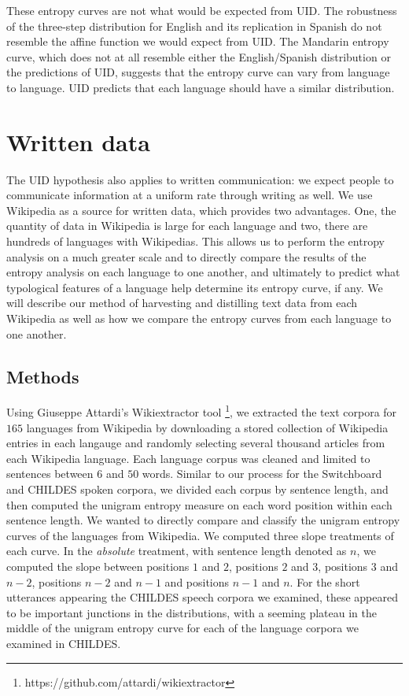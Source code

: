 \documentclass[10pt, letterpaper]{article}
\begin{document}
These entropy curves are not what would be expected from UID. The
robustness of the three-step distribution for English and its
replication in Spanish do not resemble the affine function we would
expect from UID. The Mandarin entropy curve, which does not at all
resemble either the English/Spanish distribution or the predictions of
UID, suggests that the entropy curve can vary from language to language.
UID predicts that each language should have a similar distribution.

\section{Written data}\label{written-data}

The UID hypothesis also applies to written communication: we expect
people to communicate information at a uniform rate through writing as
well. We use Wikipedia as a source for written data, which provides two
advantages. One, the quantity of data in Wikipedia is large for each
language and two, there are hundreds of languages with Wikipedias. This
allows us to perform the entropy analysis on a much greater scale and to
directly compare the results of the entropy analysis on each language to
one another, and ultimately to predict what typological features of a
language help determine its entropy curve, if any. We will describe our
method of harvesting and distilling text data from each Wikipedia as
well as how we compare the entropy curves from each language to one
another.

\subsection{Methods}\label{methods-1}

Using Giuseppe Attardi's Wikiextractor tool
\footnote{https://github.com/attardi/wikiextractor}, we extracted the
text corpora for \(165\) languages from Wikipedia by downloading a
stored collection of Wikipedia entries in each langauge and randomly
selecting several thousand articles from each Wikipedia language. Each
language corpus was cleaned and limited to sentences between \(6\) and
\(50\) words. Similar to our process for the Switchboard and CHILDES
spoken corpora, we divided each corpus by sentence length, and then
computed the unigram entropy measure on each word position within each
sentence length. We wanted to directly compare and classify the unigram
entropy curves of the languages from Wikipedia. We computed three slope
treatments of each curve. In the \emph{absolute} treatment, with
sentence length denoted as \(n\), we computed the slope between
positions \(1\) and \(2\), positions \(2\) and \(3\), positions \(3\)
and \(n-2\), positions \(n-2\) and \(n-1\) and positions \(n-1\) and
\(n\). For the short utterances appearing the CHILDES speech corpora we
examined, these appeared to be important junctions in the distributions,
with a seeming plateau in the middle of the unigram entropy curve for
each of the language corpora we examined in CHILDES.
\end{document}
